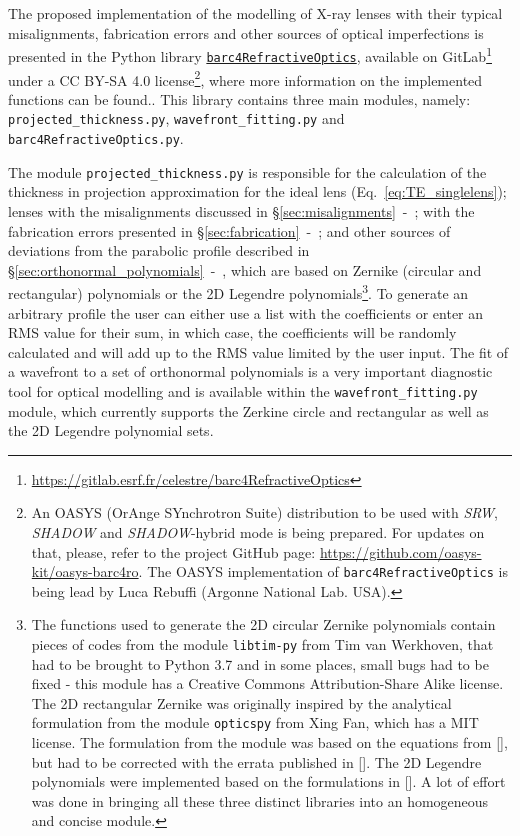 \begin{refsection}
The proposed implementation of the modelling of X-ray lenses with their typical misalignments, fabrication errors and other sources of optical imperfections is presented in the Python library \href{https://gitlab.esrf.fr/celestre/barc4RefractiveOptics}{\texttt{barc4RefractiveOptics}}, available on GitLab\footnote{\url{https://gitlab.esrf.fr/celestre/barc4RefractiveOptics}} under a CC BY-SA 4.0 license\footnote{An OASYS (OrAnge SYnchrotron Suite) distribution to be used with \textit{SRW}, \textit{SHADOW} and \textit{SHADOW}-hybrid mode is being prepared. For updates on that, please, refer to the project GitHub page: \url{https://github.com/oasys-kit/oasys-barc4ro}. The OASYS implementation of \texttt{barc4RefractiveOptics} is being lead by Luca Rebuffi (Argonne National Lab. USA).}, where more information on the implemented functions can be found.. This library contains three main modules, namely: \texttt{projected\_thickness.py}, \texttt{wavefront\_fitting.py} and \texttt{barc4RefractiveOptics.py}.

The module \texttt{projected\_thickness.py} is responsible for the calculation of the thickness in projection approximation for the ideal lens (Eq.~\ref{eq:TE_singlelens}); lenses with the misalignments discussed in \S\ref{sec:misalignments}~-~\textit{}; with the fabrication errors presented in \S\ref{sec:fabrication}~-~\textit{}; and other sources of deviations from the parabolic profile described in \S\ref{sec:orthonormal_polynomials}~-~\textit{}, which are based on Zernike (circular and rectangular) polynomials or the 2D Legendre polynomials\footnote{The functions used to generate the 2D circular Zernike polynomials contain pieces of codes from the module \texttt{libtim-py} from Tim van Werkhoven, that had to be brought to Python 3.7 and in some places, small bugs had to be fixed - this module has a Creative Commons Attribution-Share Alike
license. The 2D rectangular Zernike was originally inspired by the analytical formulation from the module \texttt{opticspy} from Xing Fan, which has a MIT license. The formulation from the module was based on the equations from [\cite{Mahajan2007}], but had to be corrected with the errata published in [\cite{Mahajan2012}]. The 2D Legendre polynomials were implemented based on the formulations in [\cite{Mahajan2010}]. A lot of effort was done in bringing all these three distinct libraries into an homogeneous and concise module.}. To generate an arbitrary profile the user can either use a list with the coefficients or enter an RMS value for their sum, in which case, the coefficients will be randomly calculated and will add up to the RMS value limited by the user input. The fit of a wavefront to a set of orthonormal polynomials is a very important diagnostic tool for optical modelling and is available within the \texttt{wavefront\_fitting.py} module, which currently supports the Zerkine circle and rectangular as well as the 2D Legendre polynomial sets.


\end{refsection}
